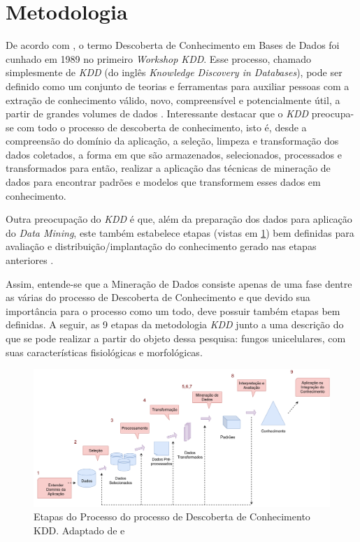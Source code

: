 \documentclass[tcc2,project]{classe_uftex/uftex}
\begin{document}
\section*{Metodologia}
\label{sec:metodologia}

    \quad De acordo com , o termo Descoberta de Conhecimento em Bases de Dados foi cunhado em 1989 no primeiro \emph{Workshop KDD}. Esse processo, chamado simplesmente de \emph{KDD} (do inglês \emph{Knowledge Discovery in Databases}), pode ser definido como um conjunto de teorias e ferramentas para auxiliar pessoas com a extração de conhecimento válido, novo, compreensível e potencialmente útil, a partir de grandes volumes de dados \cite{1996:Fayyad}. Interessante destacar que o \emph{KDD} preocupa-se com todo o processo de descoberta de conhecimento, isto é, desde a compreensão do domínio da aplicação, a seleção, limpeza e transformação dos dados coletados, a forma em que são armazenados, selecionados, processados e transformados para então, realizar a aplicação das técnicas de mineração de dados para encontrar padrões e modelos que transformem esses dados em conhecimento. 

\quad Outra preocupação do \emph{KDD} é que, além da preparação dos dados para aplicação do \emph{Data Mining}, este também estabelece  etapas (vistas em \ref{img:imag001}) bem definidas para avaliação e distribuição/implantação do conhecimento gerado nas etapas anteriores \cite{2009:Camilo}.%

\quad Assim, entende-se que a Mineração de Dados consiste apenas de uma fase dentre as várias do processo de Descoberta de Conhecimento e que devido sua importância para o processo como um todo, deve possuir também etapas bem definidas. A seguir, as 9 etapas da metodologia \emph{KDD} junto a uma descrição do que se pode realizar a partir do objeto dessa pesquisa: fungos unicelulares, com suas características fisiológicas e morfológicas.
    
    \begin{figure}[hbt]
      \includegraphics[scale=0.3]{preprojeto_Johnny/img/kdd_n.png}
      \caption{Etapas do Processo do processo de Descoberta de Conhecimento KDD. Adaptado de \cite{1996:Fayyad} e \cite{2014:Shafique}}
      \label{img:imag001}
    \end{figure}
\end{document}
